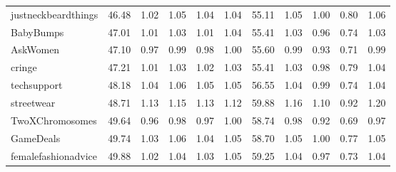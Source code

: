 \begin{tabular}{lrrrrrrrrrr}
justneckbeardthings &          46.48 &                1.02 &                1.05 &                1.04 &                1.04 &                 55.11 &                       1.05 &                       1.00 &                       0.80 &                       1.06 \\
BabyBumps           &          47.01 &                1.01 &                1.03 &                1.01 &                1.04 &                 55.41 &                       1.03 &                       0.96 &                       0.74 &                       1.03 \\
AskWomen            &          47.10 &                0.97 &                0.99 &                0.98 &                1.00 &                 55.60 &                       0.99 &                       0.93 &                       0.71 &                       0.99 \\
cringe              &          47.21 &                1.01 &                1.03 &                1.02 &                1.03 &                 55.41 &                       1.03 &                       0.98 &                       0.79 &                       1.04 \\
techsupport         &          48.18 &                1.04 &                1.06 &                1.05 &                1.05 &                 56.55 &                       1.04 &                       0.99 &                       0.74 &                       1.04 \\
streetwear          &          48.71 &                1.13 &                1.15 &                1.13 &                1.12 &                 59.88 &                       1.16 &                       1.10 &                       0.92 &                       1.20 \\
TwoXChromosomes     &          49.64 &                0.96 &                0.98 &                0.97 &                1.00 &                 58.74 &                       0.98 &                       0.92 &                       0.69 &                       0.97 \\
GameDeals           &          49.74 &                1.03 &                1.06 &                1.04 &                1.05 &                 58.70 &                       1.05 &                       1.00 &                       0.77 &                       1.05 \\
femalefashionadvice &          49.88 &                1.02 &                1.04 &                1.03 &                1.05 &                 59.25 &                       1.04 &                       0.97 &                       0.73 &                       1.04 \\

\end{tabular}

